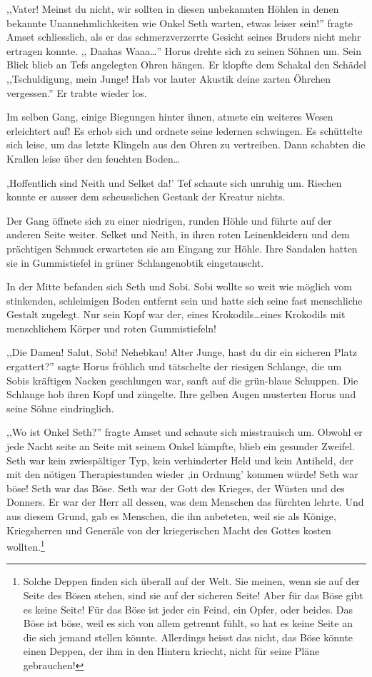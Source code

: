 \documentclass[11pt,titlepage,a5paper]{book}
\begin{document}
,,Vater! Meinst du nicht, wir sollten in diesen unbekannten Höhlen in denen bekannte Unannehmlichkeiten wie Onkel Seth warten, etwas leiser sein!'' fragte Amset schliesslich, als er das schmerzverzerrte Gesicht seines Bruders nicht mehr ertragen konnte. ,, \eighthnote \twonotes{} Daahas Waaa\dots '' Horus drehte sich zu seinen Söhnen um. Sein Blick blieb an Tefs angelegten Ohren hängen. Er klopfte dem Schakal den Schädel ,,Tschuldigung, mein Junge! Hab vor lauter Akustik deine zarten Öhrchen vergessen.'' Er trabte wieder los.

Im selben Gang, einige Biegungen hinter ihnen, atmete ein weiteres Wesen erleichtert auf! Es erhob sich und ordnete seine ledernen schwingen. Es schüttelte sich leise, um das letzte Klingeln aus den Ohren zu vertreiben. Dann schabten die Krallen leise über den feuchten Boden\dots 

,Hoffentlich sind Neith und Selket da!' Tef schaute sich unruhig um. Riechen konnte er ausser dem scheusslichen Gestank der Kreatur nichts. 

Der Gang öffnete sich zu einer niedrigen, runden Höhle und führte auf der anderen Seite weiter. Selket und Neith, in ihren roten Leinenkleidern und dem prächtigen Schmuck erwarteten sie am Eingang zur Höhle. Ihre Sandalen hatten sie in Gummistiefel in grüner Schlangenobtik eingetauscht.

 In der Mitte  befanden sich Seth und Sobi. Sobi wollte so weit wie möglich vom stinkenden, schleimigen Boden entfernt sein und hatte sich seine fast menschliche Gestalt zugelegt. Nur sein Kopf war der, eines Krokodils\dots eines Krokodils mit menschlichem Körper und roten Gummistiefeln!
 
,,Die Damen! Salut, Sobi! Nehebkau! Alter Junge, hast du dir ein sicheren Platz ergattert?'' sagte Horus fröhlich und tätschelte der riesigen Schlange, die um Sobis kräftigen Nacken geschlungen war, sanft auf die grün-blaue Schuppen. Die Schlange hob ihren Kopf und züngelte. Ihre gelben Augen musterten Horus und seine Söhne eindringlich.

,,Wo ist Onkel Seth?'' fragte Amset und schaute sich misstrauisch um. Obwohl er jede Nacht seite an Seite mit seinem Onkel kämpfte, blieb ein gesunder Zweifel. Seth war kein zwiespältiger Typ, kein verhinderter Held und kein Antiheld, der mit den nötigen Therapiestunden wieder ,in Ordnung' kommen würde! Seth war böse! Seth war das Böse. Seth war der Gott des Krieges, der Wüsten und des Donners. Er war der Herr all dessen, was dem Menschen das fürchten lehrte. Und aus diesem Grund, gab es Menschen, die ihn anbeteten, weil sie als Könige, Kriegsherren und Generäle von der kriegerischen Macht des Gottes kosten wollten.\footnote{Solche Deppen finden sich überall auf der Welt. Sie meinen, wenn sie auf der Seite des Bösen stehen, sind sie auf der sicheren Seite! Aber für das Böse gibt es keine Seite! Für das Böse ist jeder ein Feind, ein Opfer, oder beides. Das Böse ist böse, weil es sich von allem getrennt fühlt, so  hat es keine Seite an die sich jemand stellen könnte. Allerdings heisst das nicht, das Böse könnte einen  Deppen, der ihm in den Hintern kriecht, nicht für seine Pläne gebrauchen!}
\end{document}
